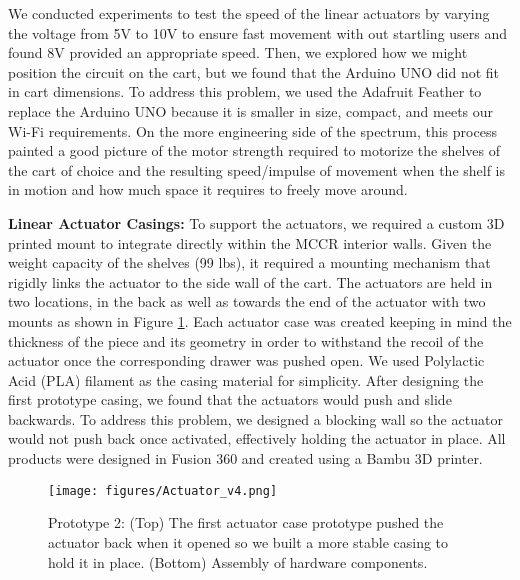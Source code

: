We conducted experiments to test the speed of the linear actuators by varying the voltage from 5V to 10V to ensure fast movement with out startling users and found 8V provided an appropriate speed. %
Then, we explored how we might position the circuit on the cart, but we found that the Arduino UNO did not fit in cart dimensions.
To address this problem, we used the Adafruit Feather to replace the Arduino UNO because it is smaller in size, compact, and meets our Wi-Fi requirements.
On the more engineering side of the spectrum, this process painted a good picture of the motor strength required to motorize the shelves of the cart of choice and the resulting speed/impulse of movement when the shelf is in motion and how much space it requires to freely move around. 







\textbf{Linear Actuator Casings:} To support the actuators, we required a custom 3D printed mount to integrate directly within the MCCR interior walls. %
Given the weight capacity of the shelves (99 lbs), it required a mounting mechanism that rigidly links the actuator to the side wall of the cart.
The actuators are held in two locations, in the back as well as towards the end of the actuator with two mounts as shown in Figure \ref{fig:actuator}.
Each actuator case was created keeping in mind the thickness of the piece and its geometry in order to withstand the recoil of the actuator once the corresponding drawer was pushed open. 
We used Polylactic Acid (PLA) filament as the casing material for simplicity.
After designing the first prototype casing, we found that the actuators would push and slide backwards. 
To address this problem, we designed a blocking wall so the actuator would not push back once activated, effectively holding the actuator in place. 
All products were designed in Fusion 360 and created using a Bambu 3D printer. 



\begin{figure}[t] 
\centering 
\texttt{[image: figures/Actuator\_v4.png]} 
\caption{Prototype 2: (Top) The first actuator case prototype pushed the actuator back when it opened so we built a more stable casing to hold it in place. (Bottom) Assembly of hardware components.} 
\vspace{-5pt}
\label{fig:actuator}
\end{figure}

